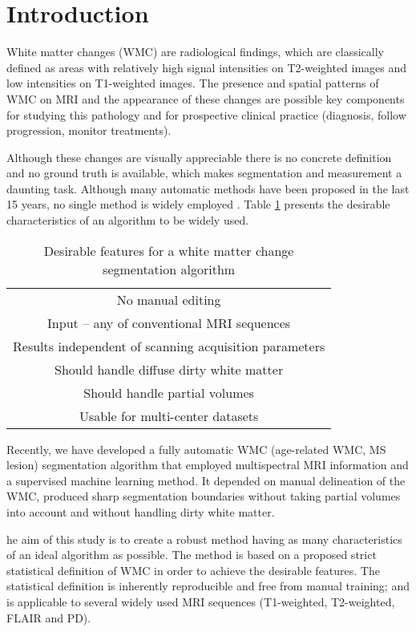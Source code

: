 \section{Introduction} \label{intro}


White matter changes (WMC) are radiological findings, which are classically defined as areas with relatively high signal intensities on T2-weighted images and low intensities on T1-weighted images. The presence and spatial patterns of WMC on MRI and the appearance of these changes are possible key components for studying this pathology and for prospective clinical practice (diagnosis, follow progression, monitor treatments).

Although these changes are visually appreciable there is no concrete definition and no ground truth is available, which makes segmentation and measurement a daunting task. Although many automatic methods have been proposed in the last 15 years, no single method is widely employed \cite{GarciaReview}. Table \ref{Table:Requirements} presents the desirable characteristics of an algorithm to be widely used.

\begin{table} 
    \begin{tabular}{ | c | }
    \hline
        No manual editing \\ 
        Input – any of conventional MRI sequences \\ 
        Results independent of scanning acquisition parameters \\ 
        Should handle diffuse dirty white matter \\ 
        Should handle partial volumes \\ 
        Usable for multi-center datasets \\
    \hline
    \end{tabular} 
    \caption{Desirable features for a white matter change segmentation algorithm } 
    \label{Table:Requirements}
\end{table}
    
Recently, we have developed a fully automatic WMC (age-related WMC, MS lesion) segmentation algorithm \cite{CascadeOrig} that employed multispectral MRI information and a supervised machine learning method. It depended on manual delineation of the WMC, produced sharp segmentation boundaries without taking partial volumes into account and without handling dirty white matter.
    
he aim of this study is to create a robust method having as many characteristics of an ideal algorithm as possible. The method is based on a proposed strict statistical definition of WMC in order to achieve the desirable features. The statistical definition is inherently reproducible and free from manual training; and is applicable to several widely used MRI sequences (T1-weighted, T2-weighted, FLAIR and PD).

